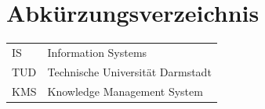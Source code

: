 \documentclass[
	english,
	ruledheaders=section,%
	class=report,%
	thesis={type=bachelor},%
	accentcolor=1b,%
	custommargins=true,%
	marginpar=false,%
	parskip=half-,%
	fontsize=11pt,%
	DIV=14,
]{tudapub}
\begin{document}
\listoftables
{}           %

\chapter*{Abkürzungsverzeichnis}

\begin{xtabular}{ll}
IS					&	Information Systems\\
TUD					&	Technische Universität Darmstadt\\
KMS                 &   Knowledge Management System \\

\end{xtabular} 


\onehalfspacing
\setcounter{seitenzahlroemisch}{\value{page}}
\end{document}
